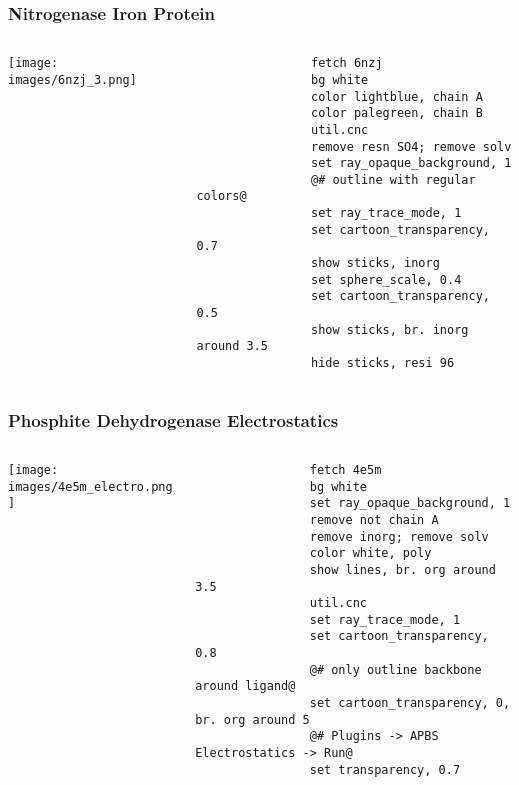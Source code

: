 \documentclass[aspectratio=169]{beamer}
\begin{document}
\begin{frame}[fragile]
\frametitle{Nitrogenase Iron Protein}
    \begin{columns}
        \begin{column}{0.50\textwidth}
            \texttt{[image: images/6nzj\_3.png]}
        \end{column}
        \begin{column}{0.50\textwidth}
            \begin{lstlisting}
                fetch 6nzj
                bg white 
                color lightblue, chain A
                color palegreen, chain B
                util.cnc
                remove resn SO4; remove solv
                set ray_opaque_background, 1
                @# outline with regular colors@
                set ray_trace_mode, 1  
                set cartoon_transparency, 0.7
                show sticks, inorg
                set sphere_scale, 0.4
                set cartoon_transparency, 0.5
                show sticks, br. inorg around 3.5
                hide sticks, resi 96
            \end{lstlisting}
        \end{column}
    \end{columns}
\end{frame}

\begin{frame}[fragile]
\frametitle{Phosphite Dehydrogenase Electrostatics}
    \begin{columns}
        \begin{column}{0.50\textwidth}
            \texttt{[image: images/4e5m\_electro.png]}
            \begin{center}
            \color{blue}{Positive} \, \color{red}{Negative}
            \end{center}
        \end{column}
        \begin{column}{0.50\textwidth}
            \vspace*{-0.2cm}
            \begin{lstlisting}
                fetch 4e5m
                bg white 
                set ray_opaque_background, 1
                remove not chain A
                remove inorg; remove solv
                color white, poly
                show lines, br. org around 3.5
                util.cnc
                set ray_trace_mode, 1  
                set cartoon_transparency, 0.8
                @# only outline backbone around ligand@
                set cartoon_transparency, 0, br. org around 5
                @# Plugins -> APBS Electrostatics -> Run@
                set transparency, 0.7
            \end{lstlisting}
        \end{column}
    \end{columns}
\end{frame}
\end{document}
